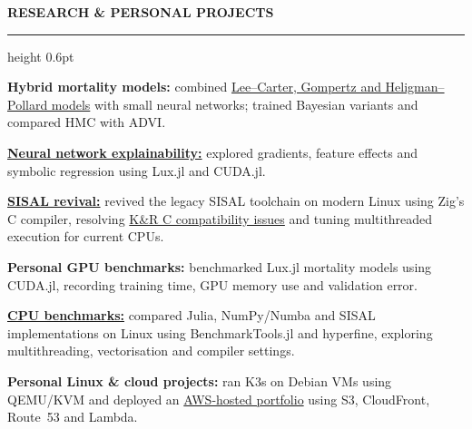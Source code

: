 \documentclass[10pt,a4paper,ragged2e,withhyper]{altacv}
\renewcommand{\cvsection}[1]{%
  \par\addvspace{0.8em}%
  {\normalsize\bfseries\color{heading}\MakeUppercase{#1}\par}%
  \nobreak\vspace{0.2em}%
  {\color{headingrule}\hrule height 0.6pt}%
  \nobreak\vspace{0.6em}%
}
\newenvironment{cvmain}{%
  \begin{minipage}[t]{0.675\textwidth}%
  \vspace{0pt}%
  \RaggedRight\fontsize{11}{14.5}\selectfont
}{%
  \end{minipage}%
}
\begin{document}
\begin{cvmain}
\cvsection{Research \& Personal Projects}
\begin{cvitems}
  \item \textbf{Hybrid mortality models:} combined \href{https://github.com/patrickm663/bayesian-neural-networks-for-actuarial-mortality-modelling}{Lee--Carter, Gompertz and Heligman--Pollard models} with small neural networks; trained Bayesian variants and compared HMC with ADVI.
  \item \href{https://github.com/patrickm663/localglmnet.jl}{\textbf{Neural network explainability:}} explored gradients, feature effects and symbolic regression using Lux.jl and CUDA.jl.
  \item \href{https://github.com/patrickm663/zigsal}{\textbf{SISAL revival:}} revived the legacy SISAL toolchain on modern Linux using Zig's C compiler, resolving \href{https://github.com/patrickm663/hello-sisal}{K\&R C compatibility issues} and tuning multithreaded execution for current CPUs.
  \item \textbf{Personal GPU benchmarks:} benchmarked Lux.jl mortality models using CUDA.jl, recording training time, GPU memory use and validation error.
  \item \href{https://github.com/patrickm663/sisal-benchmarks}{\textbf{CPU benchmarks:}} compared Julia, NumPy/Numba and SISAL implementations on Linux using BenchmarkTools.jl and hyperfine, exploring multithreading, vectorisation and compiler settings.
  \item \textbf{Personal Linux \& cloud projects:} ran K3s on Debian VMs using QEMU/KVM and deployed an \href{https://github.com/patrickm663/moehrke-co}{AWS-hosted portfolio} using S3, CloudFront, Route~53 and Lambda.
\end{cvitems}
\end{cvmain}
\end{document}
